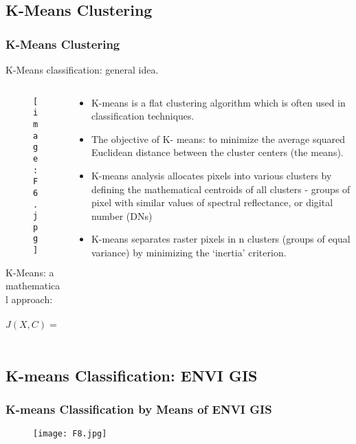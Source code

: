 \documentclass[pdflatex,compress,8pt,
	xcolor={dvipsnames,dvipsnames,svgnames,x11names,table},
	hyperref={colorlinks = true,breaklinks = true, urlcolor = NavyBlue, breaklinks = true}]{beamer}
\begin{document}
\subsection{K-Means Clustering}
\begin{frame}\frametitle{K-Means Clustering}
 K-Means classification: general idea.
\begin{minipage}[0.4\textheight]{\textwidth}
\begin{columns}[T]
\begin{column}{0.5\textwidth}
 \begin{figure}[H]
	\centering
		\texttt{[image: F6.jpg]}
\end{figure}
K-Means: a mathematical approach:\\\vspace{1em}

$J(X,C)=\sum_{i=0}^n\frac{min}{\mu_{j}\in C} (||x_j-\mu_i||^{2})$

\end{column}
\begin{column}{0.5\textwidth}
\begin{itemize}
	\item  K-means is a flat clustering algorithm which is often used in classification techniques.
	\item The objective of K- means: to minimize the average squared Euclidean distance between the cluster centers (the means).
	\item K-means analysis allocates pixels into various clusters by defining the mathematical centroids of all clusters - groups of pixel with similar values of spectral reflectance, or digital number (DNs)
	\item K-means separates raster pixels in n clusters (groups of equal variance) by minimizing the ‘inertia’ criterion.
\end{itemize}
\end{column}
\end{columns}
\end{minipage}
\end{frame}

\subsection{K-means Classification: ENVI GIS}
\begin{frame}\frametitle{K-means Classification by Means of ENVI GIS}
\begin{figure}[H]
	\centering
		\texttt{[image: F8.jpg]}
\end{figure}
\end{frame}
\end{document}
